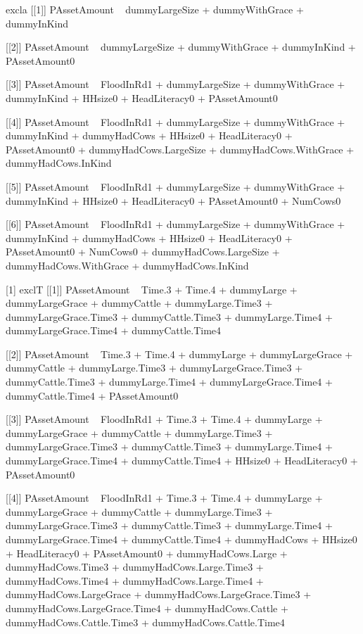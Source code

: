 \begin{Schunk}
\begin{Soutput}
[1] excla
[[1]]
PAssetAmount ~ dummyLargeSize + dummyWithGrace + dummyInKind

[[2]]
PAssetAmount ~ dummyLargeSize + dummyWithGrace + dummyInKind + 
    PAssetAmount0

[[3]]
PAssetAmount ~ FloodInRd1 + dummyLargeSize + dummyWithGrace + 
    dummyInKind + HHsize0 + HeadLiteracy0 + PAssetAmount0

[[4]]
PAssetAmount ~ FloodInRd1 + dummyLargeSize + dummyWithGrace + 
    dummyInKind + dummyHadCows + HHsize0 + HeadLiteracy0 + PAssetAmount0 + 
    dummyHadCows.LargeSize + dummyHadCows.WithGrace + dummyHadCows.InKind

[[5]]
PAssetAmount ~ FloodInRd1 + dummyLargeSize + dummyWithGrace + 
    dummyInKind + HHsize0 + HeadLiteracy0 + PAssetAmount0 + NumCows0

[[6]]
PAssetAmount ~ FloodInRd1 + dummyLargeSize + dummyWithGrace + 
    dummyInKind + dummyHadCows + HHsize0 + HeadLiteracy0 + PAssetAmount0 + 
    NumCows0 + dummyHadCows.LargeSize + dummyHadCows.WithGrace + 
    dummyHadCows.InKind

[1] exclT
[[1]]
PAssetAmount ~ Time.3 + Time.4 + dummyLarge + dummyLargeGrace + 
    dummyCattle + dummyLarge.Time3 + dummyLargeGrace.Time3 + 
    dummyCattle.Time3 + dummyLarge.Time4 + dummyLargeGrace.Time4 + 
    dummyCattle.Time4

[[2]]
PAssetAmount ~ Time.3 + Time.4 + dummyLarge + dummyLargeGrace + 
    dummyCattle + dummyLarge.Time3 + dummyLargeGrace.Time3 + 
    dummyCattle.Time3 + dummyLarge.Time4 + dummyLargeGrace.Time4 + 
    dummyCattle.Time4 + PAssetAmount0

[[3]]
PAssetAmount ~ FloodInRd1 + Time.3 + Time.4 + dummyLarge + dummyLargeGrace + 
    dummyCattle + dummyLarge.Time3 + dummyLargeGrace.Time3 + 
    dummyCattle.Time3 + dummyLarge.Time4 + dummyLargeGrace.Time4 + 
    dummyCattle.Time4 + HHsize0 + HeadLiteracy0 + PAssetAmount0

[[4]]
PAssetAmount ~ FloodInRd1 + Time.3 + Time.4 + dummyLarge + dummyLargeGrace + 
    dummyCattle + dummyLarge.Time3 + dummyLargeGrace.Time3 + 
    dummyCattle.Time3 + dummyLarge.Time4 + dummyLargeGrace.Time4 + 
    dummyCattle.Time4 + dummyHadCows + HHsize0 + HeadLiteracy0 + 
    PAssetAmount0 + dummyHadCows.Large + dummyHadCows.Time3 + 
    dummyHadCows.Large.Time3 + dummyHadCows.Time4 + dummyHadCows.Large.Time4 + 
    dummyHadCows.LargeGrace + dummyHadCows.LargeGrace.Time3 + 
    dummyHadCows.LargeGrace.Time4 + dummyHadCows.Cattle + dummyHadCows.Cattle.Time3 + 
    dummyHadCows.Cattle.Time4


\end{Soutput}
\end{Schunk}
